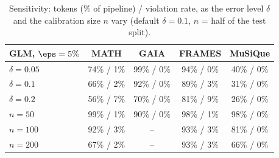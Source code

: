 \begin{table}[h]
\centering
\scriptsize
\setlength{\tabcolsep}{3pt}
\begin{tabular}{@{}lcccc@{}}
\toprule
GLM, $\eps = 5\%$ & MATH & GAIA & FRAMES & MuSiQue \\
\midrule
$\delta = 0.05$ & 74\% / 1\% & 99\% / 0\% & 94\% / 0\% & 40\% / 0\% \\
$\delta = 0.1$ & 66\% / 2\% & 92\% / 0\% & 89\% / 3\% & 31\% / 0\% \\
$\delta = 0.2$ & 56\% / 7\% & 70\% / 0\% & 81\% / 9\% & 26\% / 0\% \\
\midrule
$n = 50$ & 99\% / 1\% & 90\% / 0\% & 98\% / 1\% & 98\% / 0\% \\
$n = 100$ & 92\% / 3\% & -- & 93\% / 3\% & 81\% / 0\% \\
$n = 200$ & 67\% / 2\% & -- & 93\% / 3\% & 66\% / 0\% \\
\bottomrule
\end{tabular}
\caption{Sensitivity: tokens (\% of pipeline) / violation rate, as the error level $\delta$ and the calibration size $n$ vary
(default $\delta = 0.1$, $n$ = half of the test split).}
\label{tab:sens}
\end{table}

